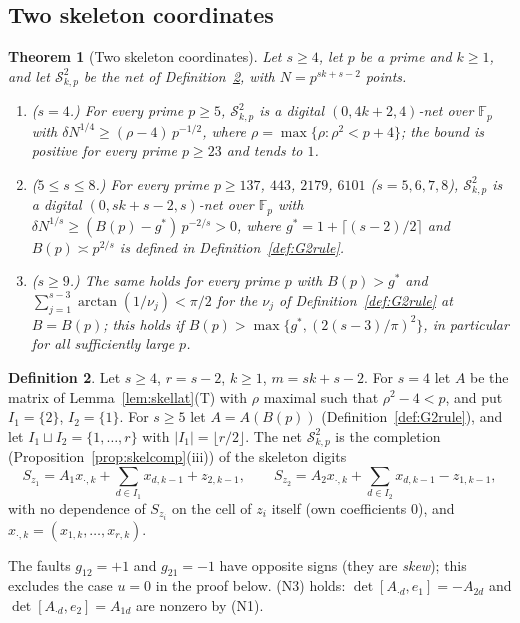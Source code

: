 \documentclass[11pt]{amsart}
\newtheorem{theorem}{Theorem}
\theoremstyle{definition}
\newtheorem{definition}[theorem]{Definition}
\theoremstyle{plain}
\newcommand{\F}{\mathbb{F}}
\begin{document}
\subsection{Two skeleton coordinates}
\begin{theorem}[Two skeleton coordinates]\label{thm:S2}
Let $s\ge4$, let $p$ be a prime and $k\ge1$, and let $\mathcal S^2_{k,p}$ be the net of Definition~\ref{def:S2}, with $N=p^{sk+s-2}$ points.
\begin{enumerate}
\item ($s=4$.) For every prime $p\ge5$, $\mathcal S^2_{k,p}$ is a digital $(0,4k+2,4)$-net over $\F_p$ with $\delta N^{1/4}\ge(\rho-4)\,p^{-1/2}$, where $\rho=\max\{\rho:\rho^2<p+4\}$; the bound is positive for every prime $p\ge23$ and tends to $1$.
\item ($5\le s\le8$.) For every prime $p\ge137$, $443$, $2179$, $6101$ ($s=5,6,7,8$), $\mathcal S^2_{k,p}$ is a digital $(0,sk+s-2,s)$-net over $\F_p$ with $\delta N^{1/s}\ge(B(p)-g^*)\,p^{-2/s}>0$, where $g^*=1+\lceil(s-2)/2\rceil$ and $B(p)\asymp p^{2/s}$ is defined in Definition~\ref{def:G2rule}.
\item ($s\ge9$.) The same holds for every prime $p$ with $B(p)>g^*$ and $\sum_{j=1}^{s-3}\arctan(1/\nu_j)<\pi/2$ for the $\nu_j$ of Definition~\ref{def:G2rule} at $B=B(p)$; this holds if $B(p)>\max\{g^*,(2(s-3)/\pi)^2\}$, in particular for all sufficiently large $p$.
\end{enumerate}
\end{theorem}

\begin{definition}\label{def:S2}
Let $s\ge4$, $r=s-2$, $k\ge1$, $m=sk+s-2$. For $s=4$ let $A$ be the matrix of Lemma~\ref{lem:skellat}(T) with $\rho$ maximal such that $\rho^2-4<p$, and put $I_1=\{2\}$, $I_2=\{1\}$. For $s\ge5$ let $A=A(B(p))$ (Definition~\ref{def:G2rule}), and let $I_1\sqcup I_2=\{1,\dots,r\}$ with $|I_1|=\lfloor r/2\rfloor$. The net $\mathcal S^2_{k,p}$ is the completion (Proposition~\ref{prop:skelcomp}(iii)) of the skeleton digits
\[
S_{z_1}=A_1x_{\cdot,k}+\sum_{d\in I_1}x_{d,k-1}+z_{2,k-1},\qquad S_{z_2}=A_2x_{\cdot,k}+\sum_{d\in I_2}x_{d,k-1}-z_{1,k-1},
\]
with no dependence of $S_{z_i}$ on the cell of $z_i$ itself (own coefficients $0$), and $x_{\cdot,k}=(x_{1,k},\dots,x_{r,k})$.
\end{definition}

The faults $g_{12}=+1$ and $g_{21}=-1$ have opposite signs (they are \emph{skew}); this excludes the case $u=0$ in the proof below. (N3) holds: $\det[A_{\cdot d},e_1]=-A_{2d}$ and $\det[A_{\cdot d},e_2]=A_{1d}$ are nonzero by (N1).
\end{document}
